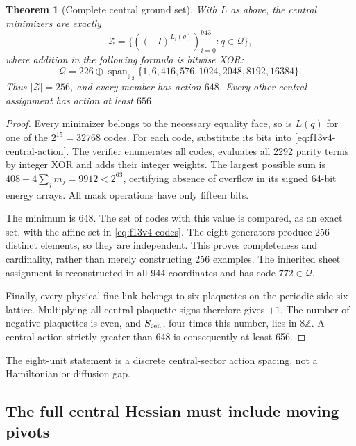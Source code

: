 \documentclass[11pt,oneside]{article}
\newtheorem{theorem}{Theorem}[section]
\begin{document}
\begin{theorem}[Complete central ground set]
\label{thm:f13v4-classification}
With \(L\) as above, the central minimizers are exactly
\[
 \mathcal Z=\{((-I)^{L_i(q)})_{i=0}^{943}:q\in\mathcal Q\},
\]
where addition in the following formula is bitwise XOR:
\begin{equation}\label{eq:f13v4-codes}
 \mathcal Q
 =226\mathbin{\oplus}
 \operatorname{span}_{\mathbb F_2}
       \{1,6,416,576,1024,2048,8192,16384\}.
\end{equation}
Thus \(|\mathcal Z|=256\), and every member has action \(648\).
Every other central assignment has action at least \(656\).
\end{theorem}

\begin{proof}
Every minimizer belongs to the necessary equality face,
so is \(L(q)\) for one of the \(2^{15}=32768\) codes.
For each code, substitute its bits into
\eqref{eq:f13v4-central-action}. The verifier enumerates
all codes, evaluates all 2292 parity terms by integer
XOR and adds their integer weights. The largest possible
sum is \(408+4\sum_jm_j=9912<2^{63}\), certifying
absence of overflow in its signed 64-bit energy arrays.
All mask operations have only fifteen bits.

The minimum is 648. The set of codes with this value
is compared, as an exact set, with the affine set in
\eqref{eq:f13v4-codes}. The eight generators produce
256 distinct elements, so they are independent. This
proves completeness and cardinality, rather than merely
constructing 256 examples. The inherited sheet assignment
is reconstructed in all 944 coordinates and has code
\(772\in\mathcal Q\).

Finally, every physical fine link belongs to six
plaquettes on the periodic side-six lattice. Multiplying
all central plaquette signs therefore gives \(+1\).
The number of negative plaquettes is even, and
\(S_{\rm cen}\), four times this number, lies in
\(8\mathbb Z\). A central action strictly greater than
648 is consequently at least 656.
\end{proof}

The eight-unit statement is a discrete central-sector
action spacing, not a Hamiltonian or diffusion gap.

\subsection{The full central Hessian must include moving pivots}
\end{document}
